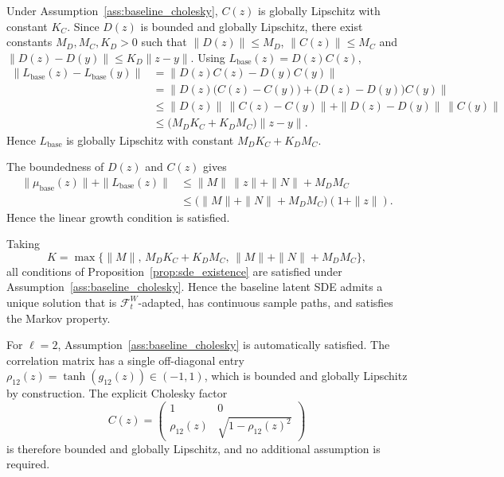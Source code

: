 \begin{description}[
    style=unboxed,
    leftmargin=0pt,
    labelindent=0pt,
    labelsep=0.5em
]
Under Assumption~\ref{ass:baseline_cholesky}, $C(z)$ is globally Lipschitz
with constant $K_C$. Since $D(z)$ is bounded and globally Lipschitz, there
exist constants $M_D,M_C,K_D>0$ such that $\|D(z)\|\leq M_D$,
$\|C(z)\|\leq M_C$ and $\|D(z)-D(y)\|\leq K_D\|z-y\|$. Using
$L_{\mathrm{base}}(z)=D(z)C(z)$,
\[
\begin{aligned}
\|L_{\mathrm{base}}(z)-L_{\mathrm{base}}(y)\|
&=
\|D(z)C(z)-D(y)C(y)\| \\
&=
\bigl\|D(z)\bigl(C(z)-C(y)\bigr)
+\bigl(D(z)-D(y)\bigr)C(y)\bigr\| \\
&\leq
\|D(z)\|\,\|C(z)-C(y)\|
+\|D(z)-D(y)\|\,\|C(y)\| \\
&\leq
\bigl(M_DK_C+K_DM_C\bigr)\|z-y\|.
\end{aligned}
\]
Hence $L_{\mathrm{base}}$ is globally Lipschitz with constant
$M_DK_C+K_DM_C$.

\item[Linear growth.]
The boundedness of $D(z)$ and $C(z)$ gives
\[
\begin{aligned}
\|\mu_{\mathrm{base}}(z)\|+\|L_{\mathrm{base}}(z)\|
&\leq
\|M\|\,\|z\|+\|N\|+M_DM_C \\
&\leq
\bigl(\|M\|+\|N\|+M_DM_C\bigr)(1+\|z\|).
\end{aligned}
\]
Hence the linear growth condition is satisfied.

\end{description}

Taking 
$$K=\max\{\|M\|,\,M_DK_C+K_DM_C,\,\|M\|+\|N\|+M_DM_C\},$$
all conditions of Proposition~\ref{prop:sde_existence} are satisfied under Assumption~\ref{ass:baseline_cholesky}. Hence the baseline latent SDE admits a unique solution that is $\mathcal{F}_t^W$-adapted, has continuous sample paths, and satisfies the Markov property.

\begin{remark}
For $\ell=2$, Assumption~\ref{ass:baseline_cholesky} is automatically
satisfied. The correlation matrix has a single off-diagonal entry
$\rho_{12}(z)=\tanh(g_{12}(z))\in(-1,1)$, which is bounded and globally
Lipschitz by construction. The explicit Cholesky factor
\[
C(z)=
\begin{pmatrix}
1 & 0 \\
\rho_{12}(z) & \sqrt{1-\rho_{12}(z)^2}
\end{pmatrix}
\]
is therefore bounded and globally Lipschitz, and no additional assumption
is required.
\end{remark}



